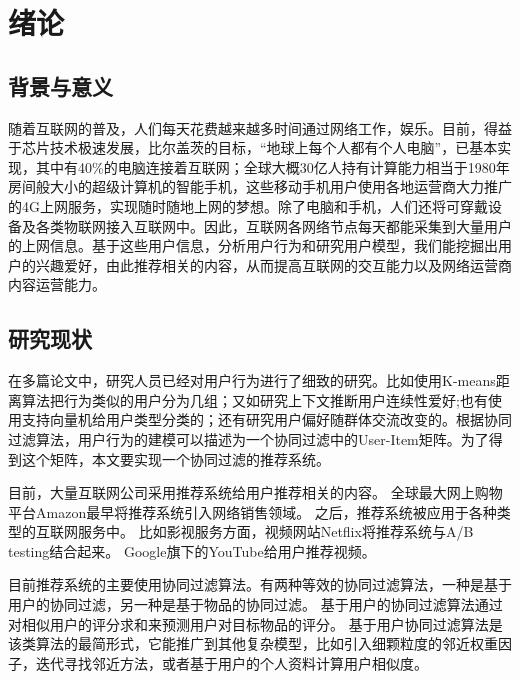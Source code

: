 \chapter{绪论}

\section{背景与意义}
随着互联网的普及，人们每天花费越来越多时间通过网络工作，娱乐。目前，得益于芯片技术极速发展，比尔盖茨的目标，“地球上每个人都有个人电脑”，已基本实现，其中有40\%的电脑连接着互联网；全球大概30亿人持有计算能力相当于1980年房间般大小的超级计算机的智能手机，这些移动手机用户使用各地运营商大力推广的4G上网服务，实现随时随地上网的梦想。除了电脑和手机，人们还将可穿戴设备及各类物联网接入互联网中。因此，互联网各网络节点每天都能采集到大量用户的上网信息。基于这些用户信息，分析用户行为和研究用户模型，我们能挖掘出用户的兴趣爱好，由此推荐相关的内容，从而提高互联网的交互能力以及网络运营商内容运营能力。

\section{研究现状}
在多篇论文中，研究人员已经对用户行为进行了细致的研究。比如使用K-means距离算法\supercite{杨清龙2013基于网络日志的互联网用户行为分析}把行为类似的用户分为几组；又如研究上下文推断用户连续性爱好\supercite{史艳翠2013基于通信数据的上下文移动用户偏好动态获取方法研究};也有使用支持向量机给用户类型分类的\supercite{程辉2013网络用户偏好分析及话题趋势预测方法研究}；还有研究用户偏好随群体交流改变的\supercite{张欢2014网络用户偏好分析方法的研究,程辉2013网络用户偏好分析及话题趋势预测方法研究}。根据协同过滤算法\supercite{Resnick}，用户行为的建模可以描述为一个协同过滤中的User-Item矩阵。为了得到这个矩阵，本文要实现一个协同过滤的推荐系统。

目前，大量互联网公司采用推荐系统给用户推荐相关的内容。
全球最大网上购物平台Amazon最早将推荐系统引入网络销售领域\supercite{1167344}。
之后，推荐系统被应用于各种类型的互联网服务中。
比如影视服务方面，视频网站Netflix将推荐系统与A/B testing结合起来\supercite{Kondo2015The}。
Google旗下的YouTube给用户推荐视频\supercite{Davidson2010The}。

目前推荐系统的主要使用协同过滤算法。有两种等效的协同过滤算法，一种是基于用户的协同过滤，另一种是基于物品的协同过滤。
基于用户的协同过滤算法通过对相似用户的评分求和来预测用户对目标物品的评分\supercite{Resnick}。
基于用户协同过滤算法是该类算法的最简形式\supercite{adomavicius2005toward}，它能推广到其他复杂模型，比如引入细颗粒度的邻近权重因子\supercite{herlocker2000explaining}，迭代寻找邻近方法\supercite{Zhang2007A}，或者基于用户的个人资料计算用户相似度\supercite{shi2009exploiting}。

